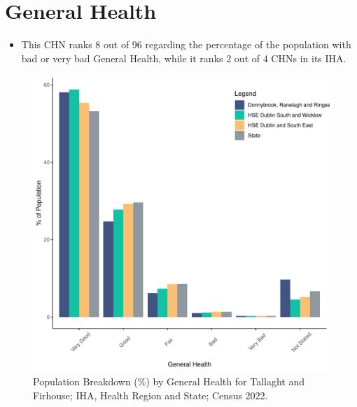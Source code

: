 \documentclass{article}
\begin{document}
\pagebreak

\section{General Health}\label{sect:GenHealth}
\begin{itemize}
\item  This CHN ranks  8 out of 96 regarding the percentage of the population with bad or very bad General Health, while it ranks   2 out of 4 CHNs in its IHA.
\end{itemize}
\begin{figure}[h]
	\centering
	\includegraphics[width = 150mm]{../figures/GenED.pdf}
	\caption{Population Breakdown (\%) by General Health for Tallaght and Firhouse; IHA, Health Region and State;  Census 2022.}
	\label{fig:2ae19629-1a6a-13a3-e055-000000000001}
	\end{figure}
\end{document}
